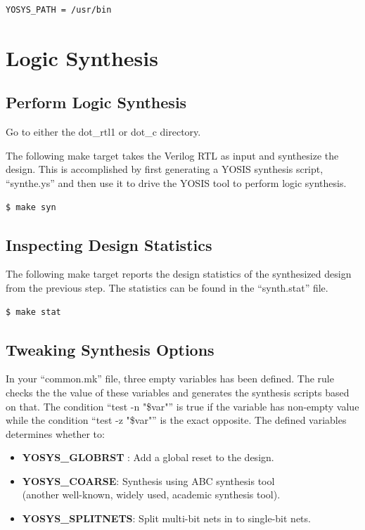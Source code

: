 \documentclass[12pt]{article}
\newcommand{\quotes}[1]{``#1''}
\begin{document}
\begin{lstlisting}[language=bash]
YOSYS_PATH = /usr/bin
\end{lstlisting}

\section{Logic Synthesis}

\subsection{Perform Logic Synthesis}

Go to either the dot\_rtl1 or dot\_c directory. 

The following make target takes the Verilog RTL as input and synthesize
the design. This is accomplished by first generating a YOSIS synthesis
script, \quotes{synthe.ys} and then use it to drive the YOSIS tool to
perform logic synthesis.

\begin{lstlisting}[language=bash]
  $ make syn
\end{lstlisting}

\subsection{Inspecting Design Statistics}

The following make target reports the design statistics of the
synthesized design from the previous step. The statistics can be found
in the \quotes{synth.stat} file.

\begin{lstlisting}[language=bash]
  $ make stat
\end{lstlisting}

\subsection{Tweaking Synthesis Options}

In your \quotes{common.mk} file, three empty variables has been
defined. The rule checks the the value of these variables and
generates the synthesis scripts based on that. The condition
\quotes{test -n "\$var"} is true if the variable has non-empty value
while the condition \quotes{test -z "\$var"} is the exact
opposite. The defined variables determines whether to:

\begin{itemize}
\item \textbf{YOSYS\_GLOBRST} : Add a global reset to the design.
\item \textbf{YOSYS\_COARSE}: Synthesis using ABC synthesis tool\\(another well-known, widely used, academic synthesis tool).
\item \textbf{YOSYS\_SPLITNETS}: Split multi-bit nets in to single-bit nets.
\end{itemize}
\end{document}
